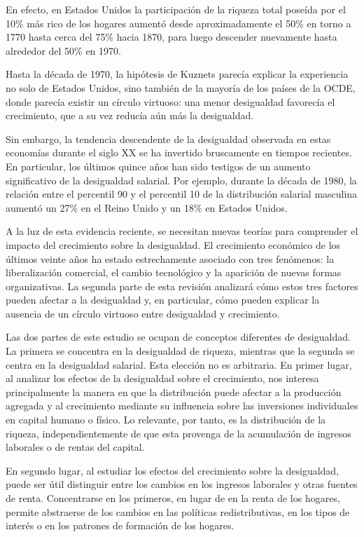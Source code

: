 \documentclass[10pt,a4paper]{article}
\begin{document}
En efecto, en Estados Unidos la participación de la riqueza total poseída por el 10\% más rico de los hogares aumentó desde aproximadamente el 50\% en torno a 1770 hasta cerca del 75\% hacia 1870, para luego descender nuevamente hasta alrededor del 50\% en 1970.

Hasta la década de 1970, la hipótesis de Kuznets parecía explicar la experiencia no solo de Estados Unidos, sino también de la mayoría de los países de la OCDE, donde parecía existir un círculo virtuoso: una menor desigualdad favorecía el crecimiento, que a su vez reducía aún más la desigualdad.

Sin embargo, la tendencia descendente de la desigualdad observada en estas economías durante el siglo XX se ha invertido bruscamente en tiempos recientes. En particular, los últimos quince años han sido testigos de un aumento significativo de la desigualdad salarial. Por ejemplo, durante la década de 1980, la relación entre el percentil 90 y el percentil 10 de la distribución salarial masculina aumentó un 27\% en el Reino Unido y un 18\% en Estados Unidos.

A la luz de esta evidencia reciente, se necesitan nuevas teorías para comprender el impacto del crecimiento sobre la desigualdad. El crecimiento económico de los últimos veinte años ha estado estrechamente asociado con tres fenómenos: la liberalización comercial, el cambio tecnológico y la aparición de nuevas formas organizativas. La segunda parte de esta revisión analizará cómo estos tres factores pueden afectar a la desigualdad y, en particular, cómo pueden explicar la ausencia de un círculo virtuoso entre desigualdad y crecimiento.

Las dos partes de este estudio se ocupan de conceptos diferentes de desigualdad. La primera se concentra en la desigualdad de riqueza, mientras que la segunda se centra en la desigualdad salarial. Esta elección no es arbitraria. En primer lugar, al analizar los efectos de la desigualdad sobre el crecimiento, nos interesa principalmente la manera en que la distribución puede afectar a la producción agregada y al crecimiento mediante su influencia sobre las inversiones individuales en capital humano o físico. Lo relevante, por tanto, es la distribución de la riqueza, independientemente de que esta provenga de la acumulación de ingresos laborales o de rentas del capital.

En segundo lugar, al estudiar los efectos del crecimiento sobre la desigualdad, puede ser útil distinguir entre los cambios en los ingresos laborales y otras fuentes de renta. Concentrarse en los primeros, en lugar de en la renta de los hogares, permite abstraerse de los cambios en las políticas redistributivas, en los tipos de interés o en los patrones de formación de los hogares.
\end{document}
